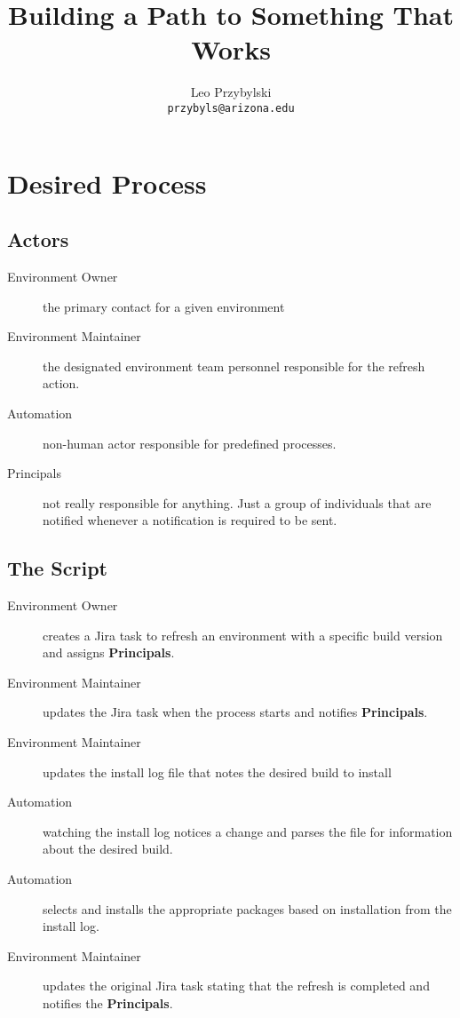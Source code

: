 \documentclass[12pt,notitlepage]{article}
\author{Leo Przybylski \\
\texttt{przybyls@arizona.edu}}
\title{Building a Path to Something That Works}
\begin{document}
\maketitle
\tableofcontents

\section{Desired Process}
\subsection{Actors}
\begin{description}
  \item[Environment Owner] the primary contact for a given environment
  \item[Environment Maintainer] the designated environment team personnel responsible for the refresh action.
  \item[Automation] non-human actor responsible for predefined processes.
  \item[Principals] not really responsible for anything. Just a group of individuals that are notified whenever
    a notification is required to be sent.
\end{description}

\subsection{The Script}

\begin{description}
\item[Environment Owner] creates a Jira task to refresh an environment with a specific build version and assigns
  \textbf{Principals}.
\item[Environment Maintainer] updates the Jira task when the process starts and notifies \textbf{Principals}.
\item[Environment Maintainer] updates the install log file that notes the desired build to install
\item[Automation] watching the install log notices a change and parses the file for information about the desired build.
\item[Automation] selects and installs the appropriate packages based on installation from the install log.
\item[Environment Maintainer] updates the original Jira task stating that the refresh is completed and notifies the \textbf{Principals}.
\end{description}
\end{document}

